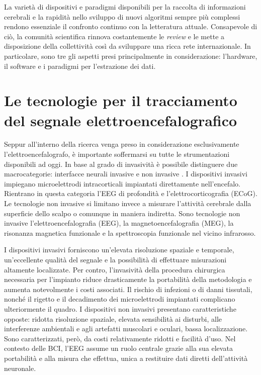 La varietà di dispositivi e paradigmi disponibili per la raccolta di informazioni cerebrali e la rapidità nello sviluppo di nuovi algoritmi sempre più complessi rendono essenziale il confronto continuo con la letteratura attuale. Consapevole di ciò, la comunità scientifica rinnova costantemente le \emph{review} \cite{lotte2007review, lotte2018review, abiri2019comprehensive} e le mette a disposizione della collettività così da sviluppare una ricca rete internazionale. In particolare, sono tre gli aspetti presi principalmente in considerazione: l’hardware, il software e i paradigmi per l’estrazione dei dati.

\section{Le tecnologie per il tracciamento del segnale elettroencefalografico}
Seppur all’interno della ricerca venga preso in considerazione esclusivamente l’elettroencefalografo, è importante soffermarsi su tutte le strumentazioni disponibili ad oggi. In base al grado di invasività è possibile distinguere due macrocategorie: interfacce neurali invasive e non invasive \cite{peksa2023stateoftheart}. I dispositivi invasivi impiegano microelettrodi intracorticali impiantati direttamente nell’encefalo. Rientrano in questa categoria l’EEG di profondità e l’elettrocorticografia (ECoG). Le tecnologie non invasive si limitano invece a misurare l’attività cerebrale dalla superficie dello scalpo o comunque in maniera indiretta. Sono tecnologie non invasive l’elettroencefalografia (EEG), la magnetoencefalografia (MEG), la risonanza magnetica funzionale e la spettroscopia funzionale nel vicino infrarosso. 

I dispositivi invasivi forniscono un’elevata risoluzione spaziale e temporale, un’eccellente qualità del segnale e la possibilità di effettuare misurazioni altamente localizzate. Per contro, l’invasività della procedura chirurgica necessaria per l’impianto riduce drasticamente la portabilità della metodologia e aumenta notevolmente i costi associati. Il rischio di infezioni o di danni tissutali, nonché il rigetto e il decadimento dei microelettrodi impiantati complicano ulteriormente il quadro.
I dispositivi non invasivi presentano caratteristiche opposte: ridotta risoluzione spaziale, elevata sensibilità ai disturbi, alle interferenze ambientali e agli artefatti muscolari e oculari, bassa localizzazione. Sono caratterizzati, però, da costi relativamente ridotti e facilità d’uso. Nel contesto delle BCI, l’EEG assume un ruolo centrale grazie alla sua elevata portabilità e alla misura che effettua, unica a restituire dati diretti dell’attività neuronale. 

